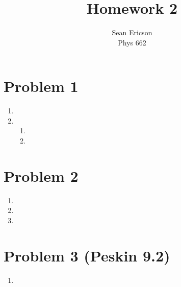 \documentclass[12pt]{article}
\begin{document}
\title{Homework 2}
\author{Sean Ericson \\ Phys 662}
\maketitle

\section*{Problem 1}
\begin{enumerate}[label=(\alph*)]
    \item 
    \item
    \begin{enumerate}[label=\roman*)]
        \item 
        \item
    \end{enumerate}
\end{enumerate}

\section*{Problem 2}
\begin{enumerate}[label=(\alph*)]
    \item 
    \item
    \item
\end{enumerate}


\section*{Problem 3 (Peskin 9.2)}
\begin{enumerate}[label=(\alph*)]
    \item 
\end{enumerate}
\end{document}
